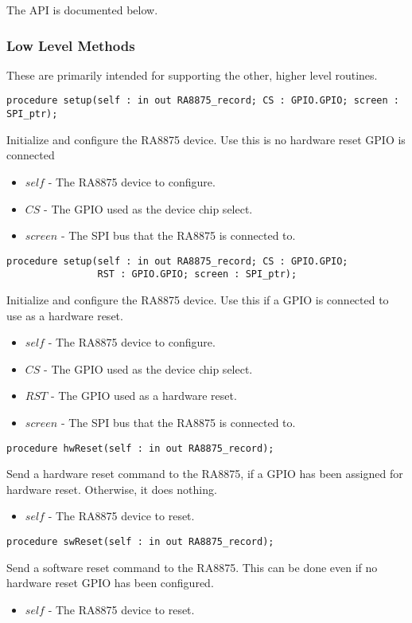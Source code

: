 \documentclass[10pt, openany]{book}
\newcommand{\indexfunc}[1]{\index[func]{#1}}
\begin{document}
The API is documented below.

\subsubsection{Low Level Methods}
These are primarily intended for supporting the other, higher level routines.
\begin{lstlisting}
procedure setup(self : in out RA8875_record; CS : GPIO.GPIO; screen : SPI_ptr);
\end{lstlisting}
\indexfunc{setup}
Initialize and configure the RA8875 device.  Use this is no hardware reset GPIO is connected
\begin{itemize}
  \item $self$ - The RA8875 device to configure.
  \item $CS$ - The GPIO used as the device chip select.
  \item $screen$ - The SPI bus that the RA8875 is connected to.
\end{itemize}

\begin{lstlisting}
procedure setup(self : in out RA8875_record; CS : GPIO.GPIO;
                RST : GPIO.GPIO; screen : SPI_ptr);
\end{lstlisting}
\indexfunc{setup}
Initialize and configure the RA8875 device.  Use this if a GPIO is connected to use as a hardware reset.
\begin{itemize}
  \item $self$ - The RA8875 device to configure.
  \item $CS$ - The GPIO used as the device chip select.
  \item $RST$ - The GPIO used as a hardware reset.
  \item $screen$ - The SPI bus that the RA8875 is connected to.
\end{itemize}

\begin{lstlisting}
procedure hwReset(self : in out RA8875_record);
\end{lstlisting}
\indexfunc{hwReset}
Send a hardware reset command to the RA8875, if a GPIO has been assigned for hardware reset.  Otherwise, it does nothing.
\begin{itemize}
  \item $self$ - The RA8875 device to reset.
\end{itemize}

\begin{lstlisting}
procedure swReset(self : in out RA8875_record);
\end{lstlisting}
\indexfunc{swReset}
Send a software reset command to the RA8875.  This can be done even if no hardware reset GPIO has been configured.
\begin{itemize}
  \item $self$ - The RA8875 device to reset.
\end{itemize}
\end{document}
